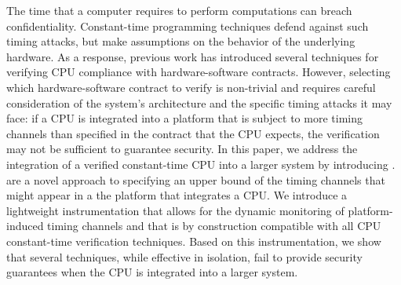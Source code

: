 The time that a computer requires to perform computations can breach confidentiality.
Constant-time programming techniques defend against such timing attacks, but make assumptions on the behavior of the underlying hardware.
As a response, previous work has introduced several techniques for verifying CPU compliance with hardware-software contracts.
%
However, selecting which hardware-software contract to verify is non-trivial and requires careful consideration of the system's architecture and the specific timing attacks it may face: if a CPU is integrated into a platform that is subject to more timing channels than specified in the contract that the CPU expects, the verification may not be sufficient to guarantee security.
In this paper, we address the integration of a verified constant-time CPU into a larger system by introducing \pics.
\pics are a novel approach to specifying an upper bound of the timing channels that might appear in a the platform that integrates a CPU.
We introduce a lightweight instrumentation that allows for the dynamic monitoring of platform-induced timing channels and that is by construction compatible with all CPU constant-time verification techniques.
Based on this instrumentation, we show that several techniques, while effective in isolation, fail to provide security guarantees when the CPU is integrated into a larger system.
